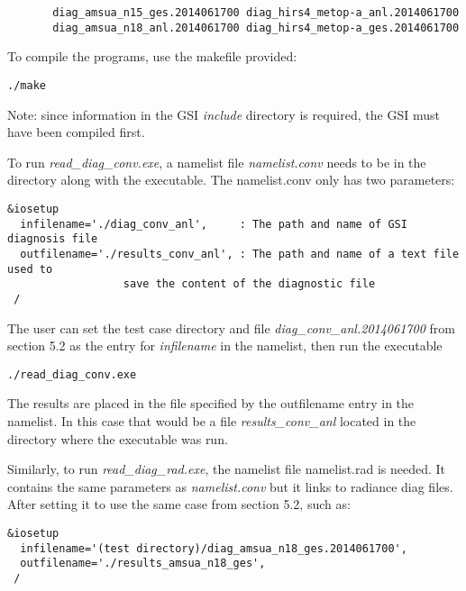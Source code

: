 \begin{scriptsize}
\begin{verbatim}
       diag_amsua_n15_ges.2014061700 diag_hirs4_metop-a_anl.2014061700
       diag_amsua_n18_anl.2014061700 diag_hirs4_metop-a_ges.2014061700
\end{verbatim}
\end{scriptsize}

To compile the programs, use the makefile provided: 
\begin{scriptsize}
\begin{verbatim}
./make 
\end{verbatim}
\end{scriptsize}

Note: since information in the GSI \textit{include} directory is required, the GSI must have been compiled first.

To run \textit{read\_diag\_conv.exe}, a namelist file \textit{namelist.conv} needs to be in the directory along with the executable. The namelist.conv only has two parameters:

\begin{scriptsize}
\begin{verbatim}
&iosetup
  infilename='./diag_conv_anl',     : The path and name of GSI diagnosis file
  outfilename='./results_conv_anl', : The path and name of a text file used to
 		          save the content of the diagnostic file
 /
\end{verbatim}
\end{scriptsize}

The user can set the test case directory and file \textit{diag\_conv\_anl.2014061700} from section 5.2 as the entry for \textit{infilename} in the namelist, then run the executable

\begin{scriptsize}
\begin{verbatim}
./read_diag_conv.exe
\end{verbatim}
\end{scriptsize}

The results are placed in the file specified by the outfilename entry in the namelist. In this case that would be a file \textit{results\_conv\_anl} located in the directory where the executable was run.

Similarly, to run \textit{read\_diag\_rad.exe}, the namelist file namelist.rad is needed. It contains the same parameters as \textit{namelist.conv} but it links to radiance diag files. After setting it to use the same case from section 5.2, such as:
\begin{scriptsize}
\begin{verbatim}
&iosetup
  infilename='(test directory)/diag_amsua_n18_ges.2014061700',
  outfilename='./results_amsua_n18_ges',
 /     
\end{verbatim}
\end{scriptsize}

